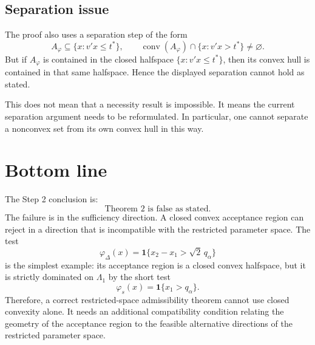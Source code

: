 \documentclass[11pt]{article}
\begin{document}
\subsection{Separation issue}

The proof also uses a separation step of the form
\[
  A_\varphi\subseteq \{x:v'x\le t^*\},
  \qquad
  \operatorname{conv}(A_\varphi)\cap\{x:v'x>t^*\}\ne\varnothing.
\]
But if \(A_\varphi\) is contained in the closed halfspace \(\{x:v'x\le t^*\}\), then its convex hull is contained in that same halfspace.  Hence the displayed separation cannot hold as stated.

This does not mean that a necessity result is impossible.  It means the current separation argument needs to be reformulated.  In particular, one cannot separate a nonconvex set from its own convex hull in this way.

\section{Bottom line}

The Step 2 conclusion is:
\[
  \boxed{\text{Theorem 2 is false as stated.}}
\]
The failure is in the sufficiency direction.  A closed convex acceptance region can reject in a direction that is incompatible with the restricted parameter space.  The test
\[
  \varphi_\Delta(x)=\mathbf{1}\{x_2-x_1>\sqrt{2}\,q_\alpha\}
\]
is the simplest example: its acceptance region is a closed convex halfspace, but it is strictly dominated on \(\Lambda_1\) by the short test
\[
  \varphi_s(x)=\mathbf{1}\{x_1>q_\alpha\}.
\]
Therefore, a correct restricted-space admissibility theorem cannot use closed convexity alone.  It needs an additional compatibility condition relating the geometry of the acceptance region to the feasible alternative directions of the restricted parameter space.
\end{document}
